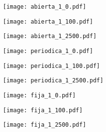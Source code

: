 \documentclass[a4paper]{article}
\begin{document}
	\begin{figure}
		\centering
		\begin{subfigure}{\textwidth}
			\centering
			\texttt{[image: abierta\_1\_0.pdf]}
			\caption{\label{fig:abierta_1_0}}
		\end{subfigure}
		\begin{subfigure}{\textwidth}
			\centering
			\texttt{[image: abierta\_1\_100.pdf]}
			\caption{\label{fig:abierta_1_100}}
		\end{subfigure}
		\begin{subfigure}{\textwidth}
			\centering
			\texttt{[image: abierta\_1\_2500.pdf]}
			\caption{\label{fig:abierta_1_2500}}
		\end{subfigure}
	\end{figure}
	\begin{figure}\ContinuedFloat
		\centering
		\begin{subfigure}{\textwidth}
			\centering
			\texttt{[image: periodica\_1\_0.pdf]}
			\caption{\label{fig:periodica_1_0}}
		\end{subfigure}
		\begin{subfigure}{\textwidth}
			\centering
			\texttt{[image: periodica\_1\_100.pdf]}
			\caption{\label{fig:periodica_1_100}}
		\end{subfigure}
		\begin{subfigure}{\textwidth}
			\centering
			\texttt{[image: periodica\_1\_2500.pdf]}
			\caption{\label{fig:periodica_1_2500}}
		\end{subfigure}
	\end{figure}
	\begin{figure}\ContinuedFloat
		\centering
		\begin{subfigure}{\textwidth}
			\centering
			\texttt{[image: fija\_1\_0.pdf]}
			\caption{\label{fig:fija_1_0}}
		\end{subfigure}
		\begin{subfigure}{\textwidth}
			\centering
			\texttt{[image: fija\_1\_100.pdf]}
			\caption{\label{fig:fija_1_100}}
		\end{subfigure}
		\begin{subfigure}{\textwidth}
			\centering
			\texttt{[image: fija\_1\_2500.pdf]}
			\caption{\label{fig:fija_1_2500}}
		\end{subfigure}
	\end{figure}
\end{document}
